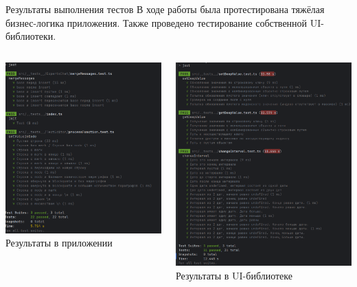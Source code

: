 \documentclass[aspectratio=169]{beamer}
\begin{document}
\begin{frame}{Результаты выполнения тестов}
\small
\justifying
В ходе работы была протестирована тяжёлая бизнес-логика приложения. Также проведено тестирование собственной UI-библиотеки.

\vspace{0.5em}

\begin{columns}
  \begin{column}{0.48\textwidth}
    \centering
    \includegraphics[width=0.8\linewidth]{static/ProjectTests.png} \\
    \small Результаты в приложении
  \end{column}
  \begin{column}{0.48\textwidth}
    \centering
    \includegraphics[width=0.8\linewidth]{static/LibTests.png} \\
    \small Результаты в UI-библиотеке
  \end{column}
\end{columns}
\end{frame}
\end{document}
